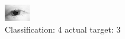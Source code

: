 \begin{figure}[h!]
\begin{center}
\includegraphics[width=0.60\columnwidth]{figures/ID4_class_4_target_3.png}
\end{center}
\caption{ Classification: 4 actual target: 3}
\label{fig:ID4_class_4_target_3}
\end{figure}
